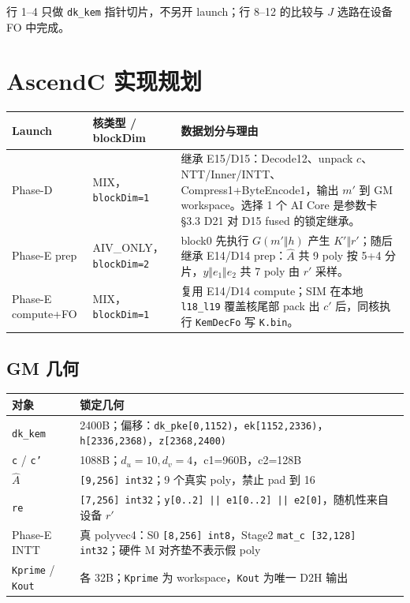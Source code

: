 \documentclass[UTF8,a4paper,11pt]{ctexart}
\begin{document}
行 1--4 只做 \texttt{dk\_kem} 指针切片，不另开 launch；行 8--12 的比较与 $J$ 选路在设备 FO 中完成。

\section{AscendC 实现规划}

\begin{longtable}{@{}L{2.8cm}L{3.1cm}L{7.2cm}@{}}
\toprule
Launch & 核类型 / blockDim & 数据划分与理由 \\
\midrule
Phase-D & MIX，\texttt{blockDim=1} & 继承 E15/D15：Decode12、unpack \(c\)、NTT/Inner/INTT、Compress1+ByteEncode1，输出 \(m'\) 到 GM workspace。选择 1 个 AI Core 是参数卡 §3.3 D21 对 D15 fused 的锁定继承。 \\
Phase-E prep & AIV\_ONLY，\texttt{blockDim=2} & block0 先执行 \(G(m'\Vert h)\) 产生 \(K'\Vert r'\)；随后继承 E14/D14 prep：\(\hat A\) 共 9 poly 按 5+4 分片，\(y\Vert e_1\Vert e_2\) 共 7 poly 由 \(r'\) 采样。 \\
Phase-E compute+FO & MIX，\texttt{blockDim=1} & 复用 E14/D14 compute；SIM 在本地 \texttt{l18\_l19} 覆盖核尾部 pack 出 \(c'\) 后，同核执行 \texttt{KemDecFo} 写 \texttt{K.bin}。 \\
\bottomrule
\end{longtable}

\subsection{GM 几何}
\begin{longtable}{@{}L{3.8cm}L{9.3cm}@{}}
\toprule
对象 & 锁定几何 \\
\midrule
\texttt{dk\_kem} & 2400B；偏移：\texttt{dk\_pke[0,1152)}，\texttt{ek[1152,2336)}，\texttt{h[2336,2368)}，\texttt{z[2368,2400)} \\
\texttt{c} / \texttt{c'} & 1088B；\(d_u=10,d_v=4\)，c1=960B，c2=128B \\
\(\hat A\) & \texttt{[9,256] int32}；9 个真实 poly，禁止 pad 到 16 \\
\texttt{re} & \texttt{[7,256] int32}；\texttt{y[0..2] || e1[0..2] || e2[0]}，随机性来自设备 \(r'\) \\
Phase-E INTT & 真 polyvec4：S0 \texttt{[8,256] int8}，Stage2 \texttt{mat\_c [32,128] int32}；硬件 M 对齐垫不表示假 poly \\
\texttt{Kprime} / \texttt{Kout} & 各 32B；\texttt{Kprime} 为 workspace，\texttt{Kout} 为唯一 D2H 输出 \\
\bottomrule
\end{longtable}
\end{document}
